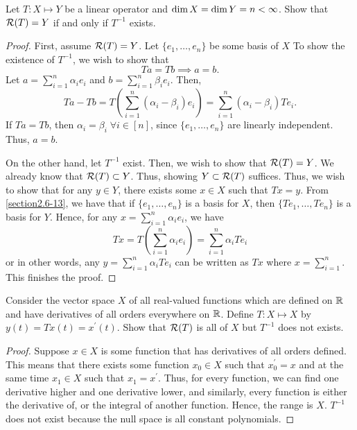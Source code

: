  \begin{question}
     Let $T : X \mapsto Y$ be a linear operator and $\dim X = \dim Y = n < \infty$. Show that $\mathcal{R}(T) = Y$ if and only if $T^{-1}$ exists.
     \label{section2.6-14}
 \end{question}
 \begin{proof}
     First, assume $\mathcal{R}(T) = Y$. Let $\{e_1 , \ldots , e_n\}$ be some basis of $X$  To show the existence of $T^{-1}$, we wish to show that 
     \[Ta = Tb \implies a = b.\]
     Let $a = \sum_{i=1}^n \alpha_i e_i$ and $b = \sum_{i=1}^n \beta_i e_i$. Then,
     \[Ta - Tb = T\left(\sum_{i=1}^n (\alpha_i - \beta_i) e_i \right) = \sum_{i=1}^n (\alpha_i - \beta_i) Te_i. \]
     If $Ta = Tb$, then $\alpha_i = \beta_i \;\forall i \in [n]$, since $\{e_1 , \ldots , e_n\}$ are linearly independent. Thus, $a = b$.

     On the other hand, let $T^{-1}$ exist. Then, we wish to show that $\mathcal{R}(T) = Y$. We already know that $\mathcal{R}(T) \subset Y$. Thus, showing $Y \subset \mathcal{R}(T)$ suffices. Thus, we wish to show that for any $y \in Y$, there exists some $x \in X$ such that $Tx = y.$ From \ref{section2.6-13}, we have that if $\{e_1 , \ldots , e_n\}$ is a basis for $X$, then $\{Te_1 , \ldots , Te_n\}$ is a basis for $Y$. Hence, for any $x = \sum_{i=1}^n \alpha_i e_i$, we have
     \[Tx = T\left( \sum_{i=1}^n \alpha_i e_i \right) = \sum_{i=1}^n \alpha_i Te_i\]
     or in other words, any $y = \sum_{i=1}^n \alpha_i Te_i$ can be written as $Tx$ where $x = \sum_{i=1}^n$. This finishes the proof.

     
 \end{proof}

 \begin{question}
     Consider the vector space $X$ of all real-valued functions which are defined on $\mathbb{R}$ and have derivatives of all orders everywhere on $\mathbb{R}$. Define $T : X \mapsto X$ by $y(t) = Tx(t) = x^\prime(t)$. Show that $\mathcal{R}(T)$ is all of $X$ but $T^{-1}$ does not exists.
     \label{section2.6-15}
 \end{question}
 \begin{proof}
     Suppose $x \in X$ is some function that has derivatives of all orders defined. This means that there exists some function $x_0 \in X$ such that $x_0^\prime =  x$ and at the same time $x_1 \in X$ such that $x_1 = x^\prime.$ Thus, for every function, we can find one derivative higher and one derivative lower, and similarly, every function is either the derivative of, or the integral of another function. Hence, the range is $X$. $T^{-1}$ does not exist because the null space is all constant polynomials.
 \end{proof}